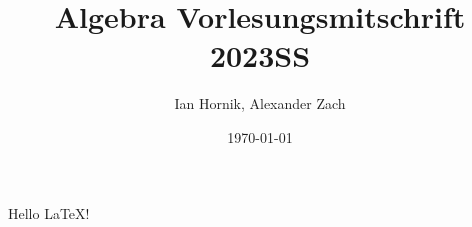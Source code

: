 \documentclass{lecture-notes}
\title{Algebra Vorlesungsmitschrift 2023SS}
\author{Ian Hornik, Alexander Zach}
\date{\today}
\begin{document}
\maketitle

Hello \LaTeX!
\end{document}

